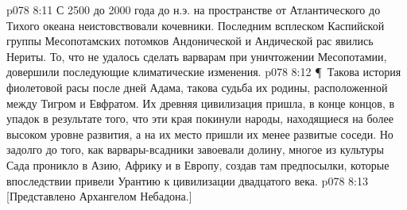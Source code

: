 \vs p078 8:11 С 2500 до 2000 года до н.э. на пространстве от Атлантического до Тихого океана неистовствовали кочевники. Последним всплеском Каспийской группы Месопотамских потомков Андонической и Андической рас явились Нериты. То, что не удалось сделать варварам при уничтожении Месопотамии, довершили последующие климатические изменения.
\vs p078 8:12 \P\ Такова история фиолетовой расы после дней Адама, такова судьба их родины, расположенной между Тигром и Евфратом. Их древняя цивилизация пришла, в конце концов, в упадок в результате того, что эти края покинули народы, находящиеся на более высоком уровне развития, а на их место пришли их менее развитые соседи. Но задолго до того, как варвары\hyp{}всадники завоевали долину, многое из культуры Сада проникло в Азию, Африку и в Европу, создав там предпосылки, которые впоследствии привели Урантию к цивилизации двадцатого века.
\vs p078 8:13 [Представлено Архангелом Небадона.]
